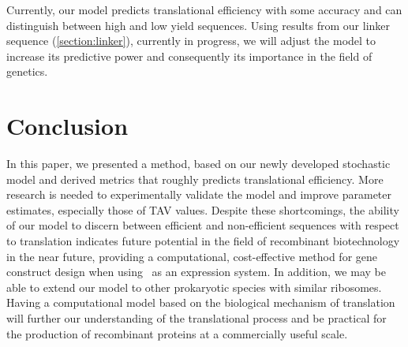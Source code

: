\documentclass[twocolumn]{article}
\begin{document}
Currently, our model predicts translational efficiency with some
accuracy and can distinguish between high and low yield sequences. 
Using results from our linker sequence (\autoref{section:linker}), 
currently in progress, we will adjust the model to increase its 
predictive power and consequently its importance in the field of 
genetics.

\section{Conclusion}
\label{section:conclusion}

In this paper, we presented a method, based on our newly
developed stochastic model and derived metrics that roughly predicts
translational efficiency.  More research is needed to
experimentally validate the model and improve parameter
estimates, especially those of TAV values. Despite these
shortcomings, the ability of our model to discern between efficient
and non-efficient sequences with respect to translation 
indicates future potential in the field of
recombinant biotechnology in the near future, providing a
computational, cost-effective method for gene construct
design when using \ecoli\ as an expression system.  In addition, 
we may be able to extend our model to other prokaryotic species with 
similar ribosomes.  Having a computational model based on the biological
mechanism of translation will further our understanding of the
translational process and be practical for the production of
recombinant proteins at a commercially useful scale.

{}
\begin{singlespace}  \end{singlespace}
\end{document}
